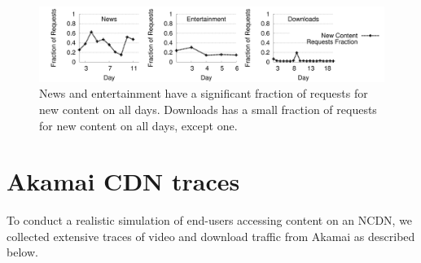  \begin{figure}[t]
\begin{center}
	\includegraphics[scale=0.4]{graphSet1/akamaidata/churn.pdf}
\end{center}
\vspace{-0.3in}
\caption{News and entertainment have a significant fraction of requests for new content on all days. Downloads has a small fraction of requests for new content on all days, except one.}
\vspace{-0.25in}
\label{fig:akamaichurn}
\end{figure}


\section{Akamai CDN traces}
\label{sec:dataset}
To conduct a realistic simulation of end-users accessing content on an  NCDN, we collected extensive traces of video and download traffic from Akamai as described below.







